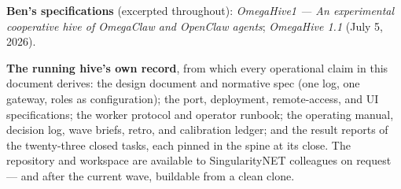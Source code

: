 \small
\textbf{Ben's specifications} (excerpted throughout): \emph{OmegaHive1 --- An experimental cooperative hive of OmegaClaw and OpenClaw agents}; \emph{OmegaHive 1.1} (July 5, 2026).

\textbf{The running hive's own record}, from which every operational claim in this document derives: the design document and normative spec (one log, one gateway, roles as configuration); the port, deployment, remote-access, and UI specifications; the worker protocol and operator runbook; the operating manual, decision log, wave briefs, retro, and calibration ledger; and the result reports of the twenty-three closed tasks, each pinned in the spine at its close. The repository and workspace are available to SingularityNET colleagues on request --- and after the current wave, buildable from a clean clone.
\normalsize
